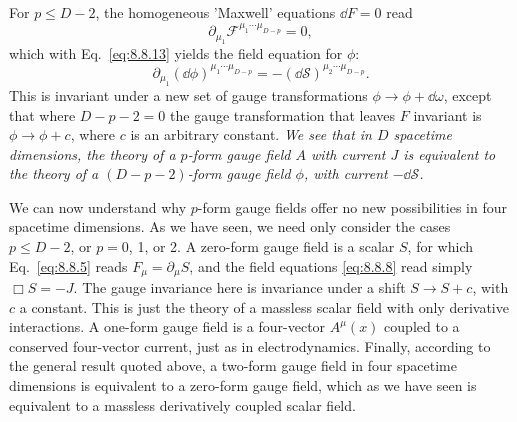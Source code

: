 For $p\leq D-2$, the homogeneous 'Maxwell' equations $\dd F=0$ read
\begin{equation}
\partial_{\mu_1}\mathcal F^{\mu_1\cdots\mu_{D-p}}=0,
\tag{8.8.14}\label{eq:8.8.14}
\end{equation}
which with Eq.~\eqref{eq:8.8.13} yields the field equation for $\phi$:
\begin{equation}
\partial_{\mu_1}(\dd\phi)^{\mu_1\cdots\mu_{D-p}}
=-(\dd\mathcal S)^{\mu_2\cdots\mu_{D-p}}.
\tag{8.8.15}\label{eq:8.8.15}
\end{equation}
This is invariant under a new set of gauge transformations
$\phi\to\phi+\dd\omega$, except that where $D-p-2=0$ the gauge transformation
that leaves $F$ invariant is $\phi\to\phi+c$, where $c$ is an arbitrary
constant. \emph{We see that in $D$ spacetime dimensions, the theory of a
$p$-form gauge field $A$ with current $J$ is equivalent to the theory of a
$(D-p-2)$-form gauge field $\phi$, with current $-\dd\mathcal S$.}

We can now understand why $p$-form gauge fields offer no new possibilities in
four spacetime dimensions. As we have seen, we need only consider the cases
$p\leq D-2$, or $p=0$, 1, or 2. A zero-form gauge field is a scalar $S$, for
which Eq.~\eqref{eq:8.8.5} reads $F_\mu=\partial_\mu S$, and the field equations
\eqref{eq:8.8.8} read simply $\Box S=-J$. The gauge invariance here is invariance
under a shift $S\to S+c$, with $c$ a constant. This is just the theory of a
massless scalar field with only derivative interactions. A one-form gauge
field is a four-vector $A^\mu(x)$ coupled to a conserved four-vector current,
just as in electrodynamics. Finally, according to the general result quoted
above, a two-form gauge field in four spacetime dimensions is equivalent to
a zero-form gauge field, which as we have seen is equivalent to a massless
derivatively coupled scalar field.
